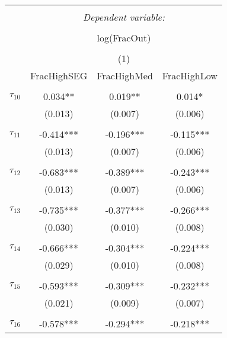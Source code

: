 \begin{tabular}{@{\extracolsep{-0pt}}lccc} 
\\[-1.8ex]\hline 
\hline \\[-1.8ex] 
 & \multicolumn{3}{c}{\textit{Dependent variable:}} \\ 
\cline{2-4} 
\\[-1.8ex] & \multicolumn{3}{c}{log(FracOut)}\\ 
\\[-1.8ex] & \multicolumn{3}{c}{(1)} \\ 
\cline{2-4} 
        & FracHighSEG & FracHighMed & FracHighLow  \\
\hline \\[-1.8ex] 
$\tau_{10}$     &  0.034**  &  0.019**  &   0.014*  \\
                &  (0.013)  &  (0.007)  &  (0.006)  \\
                &           &           &           \\[-2.1ex]
$\tau_{11}$     & -0.414*** & -0.196*** & -0.115*** \\
                &  (0.013)  &  (0.007)  &  (0.006)  \\
                &           &           &           \\[-2.1ex]
$\tau_{12}$     & -0.683*** & -0.389*** & -0.243*** \\
                &  (0.013)  &  (0.007)  &  (0.006)  \\
                &           &           &           \\[-2.1ex]
$\tau_{13}$     & -0.735*** & -0.377*** & -0.266*** \\
                &  (0.030)  &  (0.010)  &  (0.008)  \\
                &           &           &           \\[-2.1ex]
$\tau_{14}$     & -0.666*** & -0.304*** & -0.224*** \\
                &  (0.029)  &  (0.010)  &  (0.008)  \\
                &           &           &           \\[-2.1ex]
$\tau_{15}$     & -0.593*** & -0.309*** & -0.232*** \\
                &  (0.021)  &  (0.009)  &  (0.007)  \\
                &           &           &           \\[-2.1ex]
$\tau_{16}$     & -0.578*** & -0.294*** & -0.218*** \\

\end{tabular}
